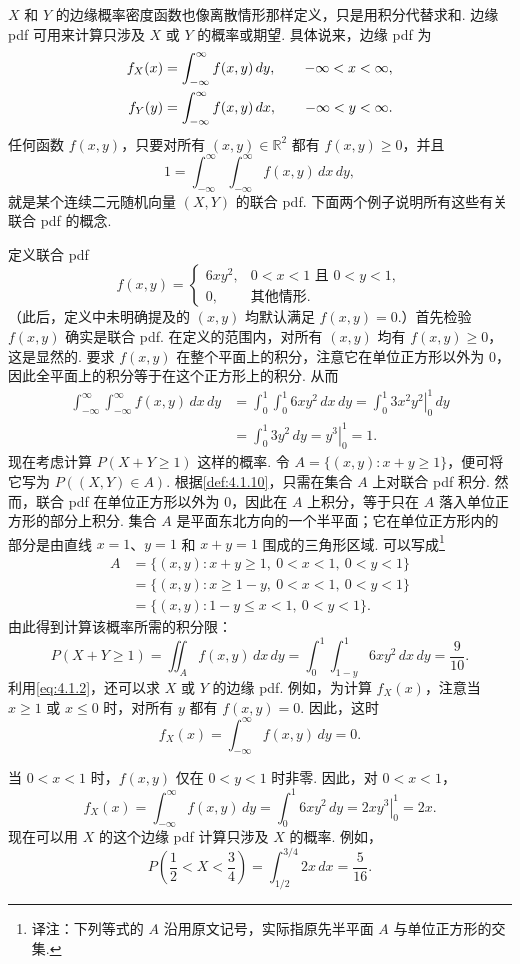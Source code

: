 $X$ 和 $Y$ 的边缘概率密度函数也像离散情形那样定义，只是用积分代替求和. 边缘 pdf 可用来计算只涉及 $X$ 或 $Y$ 的概率或期望. 具体说来，边缘 pdf 为
\begin{equation}\label{eq:4.1.2}\index{SI0834@边缘}
\begin{aligned}
f_X(x)&=\int_{-\infty}^{\infty}f(x,y)\,dy,\qquad-\infty<x<\infty,\\
f_Y(y)&=\int_{-\infty}^{\infty}f(x,y)\,dx,\qquad-\infty<y<\infty.
\end{aligned}
\end{equation}
任何函数 $f(x,y)$，只要对所有 $(x,y)\in\mathbb R^2$ 都有 $f(x,y)\ge0$，并且
$$1=\int_{-\infty}^{\infty}\int_{-\infty}^{\infty}f(x,y)\,dx\,dy,$$
就是某个连续二元随机向量 $(X,Y)$ 的联合 pdf. 下面两个例子说明所有这些有关联合 pdf 的概念.
\begin{example}[联合概率的计算——I]\label{ex:4.1.11}
定义联合 pdf
$$f(x,y)=\begin{cases}6xy^2,&0<x<1\text{ 且 }0<y<1,\\0,&\text{其他情形}.\end{cases}$$
（此后，定义中未明确提及的 $(x,y)$ 均默认满足 $f(x,y)=0$.）首先检验 $f(x,y)$ 确实是联合 pdf. 在定义的范围内，对所有 $(x,y)$ 均有 $f(x,y)\ge0$，这是显然的. 要求 $f(x,y)$ 在整个平面上的积分，注意它在单位正方形以外为 0，因此全平面上的积分等于在这个正方形上的积分. 从而
$$
\begin{aligned}
\int_{-\infty}^{\infty}\int_{-\infty}^{\infty}f(x,y)\,dx\,dy
&=\int_0^1\int_0^1 6xy^2\,dx\,dy=\int_0^1\left.3x^2y^2\right|_0^1\,dy\\
&=\int_0^1 3y^2\,dy=\left.y^3\right|_0^1=1.
\end{aligned}
$$
现在考虑计算 $P(X+Y\ge1)$ 这样的概率. 令 $A=\{(x,y):x+y\ge1\}$，便可将它写为 $P((X,Y)\in A)$. 根据\autoref{def:4.1.10}，只需在集合 $A$ 上对联合 pdf 积分. 然而，联合 pdf 在单位正方形以外为 0，因此在 $A$ 上积分，等于只在 $A$ 落入单位正方形的部分上积分. 集合 $A$ 是平面东北方向的一个半平面；它在单位正方形内的部分是由直线 $x=1$、$y=1$ 和 $x+y=1$ 围成的三角形区域. 可以写成\footnote{译注：下列等式的 $A$ 沿用原文记号，实际指原先半平面 $A$ 与单位正方形的交集.}
$$
\begin{aligned}
A&=\{(x,y):x+y\ge1,\ 0<x<1,\ 0<y<1\}\\
&=\{(x,y):x\ge1-y,\ 0<x<1,\ 0<y<1\}\\
&=\{(x,y):1-y\le x<1,\ 0<y<1\}.
\end{aligned}
$$
由此得到计算该概率所需的积分限：
$$P(X+Y\ge1)=\iint_A f(x,y)\,dx\,dy=\int_0^1\int_{1-y}^1 6xy^2\,dx\,dy=\frac9{10}.$$
利用\eqref{eq:4.1.2}，还可以求 $X$ 或 $Y$ 的边缘 pdf. 例如，为计算 $f_X(x)$，注意当 $x\ge1$ 或 $x\le0$ 时，对所有 $y$ 都有 $f(x,y)=0$. 因此，这时
$$f_X(x)=\int_{-\infty}^{\infty}f(x,y)\,dy=0.$$
\par\pagebreak[4]

当 $0<x<1$ 时，$f(x,y)$ 仅在 $0<y<1$ 时非零. 因此，对 $0<x<1$，
$$f_X(x)=\int_{-\infty}^{\infty}f(x,y)\,dy=\int_0^1 6xy^2\,dy=\left.2xy^3\right|_0^1=2x.$$
现在可以用 $X$ 的这个边缘 pdf 计算只涉及 $X$ 的概率. 例如，
$$P\left(\frac12<X<\frac34\right)=\int_{1/2}^{3/4}2x\,dx=\frac5{16}.$$
\end{example}
